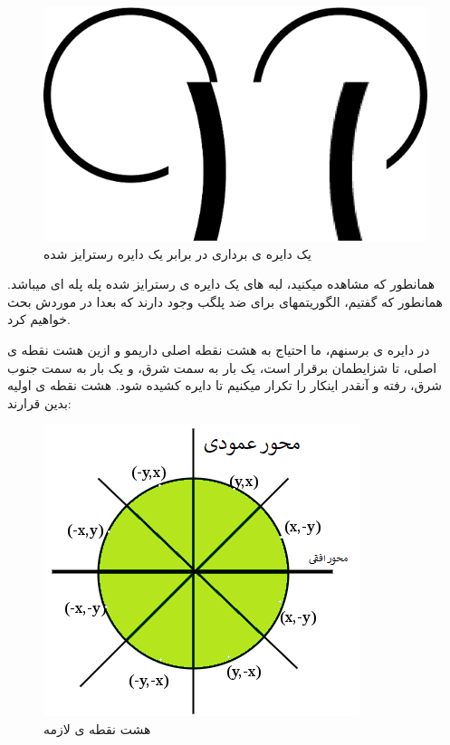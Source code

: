 \documentclass[14pt,a4paper]{memoir}
\begin{document}
	\begin{figure}[H]
		\centering
		\includegraphics[scale=0.3]{RasterizedCircle}
		\caption{یک دایره ی برداری در برابر یک دایره رسترایز شده}
	\end{figure}

همانطور که مشاهده میکنید، لبه های یک دایره ی رسترایز شده پله پله ای میباشد. همانطور که گفتیم، الگوریتمهای برای ضد پلگب وجود دارند که بعدا در موردش بحث خواهیم کرد.

در دایره ی برسنهم، ما احتیاج به هشت نقطه اصلی داریمو و ازین هشت نقطه ی اصلی، تا شزایطمان برقرار است، یک بار به سمت شرق، و یک بار به سمت جنوب شرق، رفته و آنقدر اینکار را تکرار میکنیم تا دایره کشیده شود. هشت نقطه ی اولیه بدین قرارند:
 
	 \begin{figure}[H]
	 	\centering
	 	\includegraphics[scale=1]{Bresenham_Cricle}
	 	\caption{هشت نقطه ی لازمه}
	 \end{figure}
	 
\end{document}
